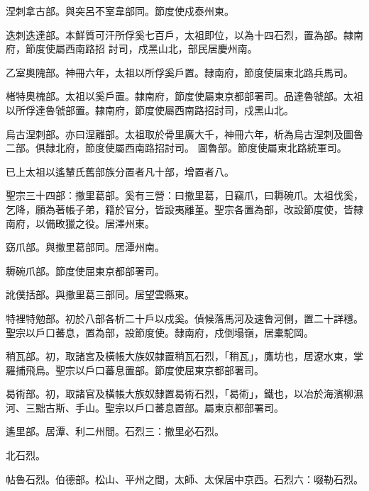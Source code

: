 \begin{pinyinscope}
 涅刺拿古部。與突呂不室韋部同。節度使戍泰州東。



 迭刺迭達部。本鮮質可汗所俘奚七百戶，太祖即位，以為十四石烈，置為部。隸南府，節度使屬西南路招
 討司，戍黑山北，部民居慶州南。



 乙室奧隗部。神冊六年，太祖以所俘奚戶置。隸南府，節度使屆東北路兵馬司。



 楮特奧槐部。太祖以奚戶置。隸南府，節度使屬東京都部署司。品達魯虢部。太祖以所俘達魯虢部置。隸南府，節度使屬西南路招討司，戍黑山北。



 烏古涅刺部。亦曰涅離部。太祖取於骨里廣大千，神冊六年，析為烏古涅刺及圖魯二部。俱隸北府，節度使屬西南路招討司。
 圖魯部。節度使屬東北路統軍司。



 已上太祖以遙輦氏舊部族分置者凡十部，增置者八。



 聖宗三十四部：撤里葛部。奚有三營：曰撤里葛，日竊爪，曰耨碗爪。太祖伐奚，乞降，願為著帳子弟，籍於官分，皆設夷離堇。聖宗各置為部，改設節度使，皆隸南府，以備畋獵之役。居澤州東。



 窈爪部。與撤里葛部同。居潭州南。



 耨碗爪部。節度使屈東京都部署司。



 訛僕括部。與撤里葛三部同。居望雲縣東。



 特裡特勉部。初於八部各析二十戶以戍奚。偵候落馬河及速魯河側，置二十詳穩。聖宗以戶口蕃息，置為部，設節度使。隸南府，戍倒塌嶺，居橐駝岡。



 稍瓦部。初，取諸宮及橫帳大族奴隸置稍瓦石烈，「稍瓦」，鷹坊也，居遼水東，掌羅捕飛鳥。聖宗以戶口蕃息置部。節度使屈東京都部署司。



 曷術部。初，取諸官及橫帳大族奴隸置曷術石烈，「曷術」，鐵也，以冶於海濱柳濕河、三黜古斯、手山。聖宗以戶口蕃息置部。屬東京都部署司。



 遙里部。居潭、利二州間。石烈三：撤里必石烈。



 北石烈。



 帖魯石烈。伯德部。松山、平州之間，太師、太保居中京西。石烈六：啜勒石烈。




\end{pinyinscope}
